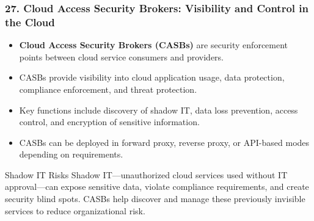 \documentclass{beamer}
\begin{document}
		\begin{frame}
			\frametitle{27. Cloud Access Security Brokers: Visibility and Control in the Cloud}
			\begin{itemize}
				\item \textbf{Cloud Access Security Brokers (CASBs)} are security enforcement points between cloud service consumers and providers.
				\item CASBs provide visibility into cloud application usage, data protection, compliance enforcement, and threat protection.
				\item Key functions include discovery of shadow IT, data loss prevention, access control, and encryption of sensitive information.
				\item CASBs can be deployed in forward proxy, reverse proxy, or API-based modes depending on requirements.
			\end{itemize}
			
			\begin{alertblock}{Shadow IT Risks}
				\scriptsize
				Shadow IT—unauthorized cloud services used without IT approval—can expose sensitive data, violate compliance requirements, and create security blind spots. CASBs help discover and manage these previously invisible services to reduce organizational risk.
			\end{alertblock}
		\end{frame}
		
\end{document}
